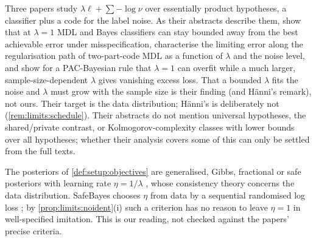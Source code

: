 \begin{remark}\label{rem:related:mdl}
Three papers study $\lambda\ell+\sum-\log\nu$ over essentially product hypotheses, a classifier plus a code for the label noise. As their abstracts describe them, \citet{grunwald2007suboptimal} show that at $\lambda=1$ MDL and Bayes classifiers can stay bounded away from the best achievable error under misspecification, \citet{zhu2025quantifying} characterise the limiting error along the regularisation path of two-part-code MDL as a function of $\lambda$ and the noise level, and \citet{zhu2026overfitting} show for a PAC-Bayesian rule that $\lambda=1$ can overfit while a much larger, sample-size-dependent $\lambda$ gives vanishing excess loss. That a bounded $\lambda$ fits the noise and $\lambda$ must grow with the sample size is their finding (and H\"anni's remark), not ours. Their target is the data distribution; H\"anni's is deliberately not (\cref{rem:limits:schedule}). Their abstracts do not mention universal hypotheses, the shared/private contrast, or Kolmogorov-complexity classes with lower bounds over all hypotheses; whether their analysis covers some of this can only be settled from the full texts.
\end{remark}

\begin{remark}\label{rem:related:posteriors}
The posteriors of \cref{def:setup:objectives} are generalised, Gibbs, fractional or safe posteriors with learning rate $\eta=1/\lambda$ \citep{bissiri2016general,bhattacharya2019fractional,grunwald2012safe,grunwald2017inconsistency,zhang2006epsilon}, whose consistency theory concerns the data distribution. SafeBayes chooses $\eta$ from data by a sequential randomised log loss \citep{grunwald2012safe}; by \cref{prop:limits:noident}(i) such a criterion has no reason to leave $\eta=1$ in well-specified imitation. This is our reading, not checked against the papers' precise criteria.
\end{remark}

